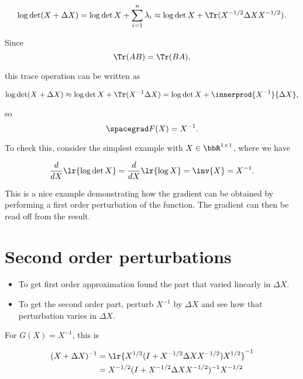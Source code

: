 \begin{dmath}\label{eqn:convexOptimizationLecture3:380}
\log \det ( X + \Delta X )
=
\log \det X +
\sum_{i = 1}^n \lambda_i
\approx
\log \det X +
\Tr( X^{-1/2} \Delta X X^{-1/2} ).
\end{dmath}

Since
\begin{dmath}\label{eqn:convexOptimizationLecture3:400}
\Tr( A B ) = \Tr( B A ),
\end{dmath}

this trace operation can be written as

\begin{dmath}\label{eqn:convexOptimizationLecture3:420}
\log \det ( X + \Delta X )
\approx
\log \det X +
\Tr( X^{-1} \Delta X )
=
\log \det X +
\innerprod{ X^{-1}}{\Delta X},
\end{dmath}

so
\begin{dmath}\label{eqn:convexOptimizationLecture3:440}
\spacegrad F(X) = X^{-1}.
\end{dmath}

To check this, consider the simplest example with \( X \in \bbR^{1 \times 1} \), where we have

\begin{dmath}\label{eqn:convexOptimizationLecture3:460}
\frac{d}{dX} \lr{ \log \det X } = \frac{d}{dX} \lr{ \log X } = \inv{X} = X^{-1}.
\end{dmath}

This is a nice example demonstrating how the gradient can be obtained by performing a
first order perturbation of the function.  The gradient can then be read off from the result.

\section{Second order perturbations}

\begin{itemize}
\item To get first order approximation found the part that varied linearly in \( \Delta X \).
\item To get the second order part, perturb \( X^{-1} \) by \( \Delta X \) and see how that perturbation varies in \( \Delta X \).
\end{itemize}

For \( G(X) = X^{-1} \), this is

\begin{dmath}\label{eqn:convexOptimizationLecture3:480}
\begin{aligned}
(X + \Delta X)^{-1}
&=
\lr{ X^{1/2} (I + X^{-1/2} \Delta X X^{-1/2} ) X^{1/2} }^{-1} \\
&=
X^{-1/2} (I + X^{-1/2} \Delta X X^{-1/2} )^{-1} X^{-1/2}
\end{aligned}
\end{dmath}

